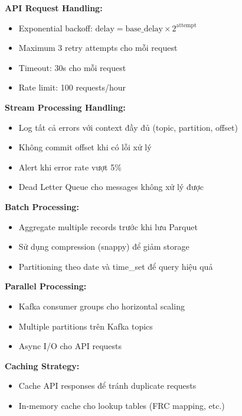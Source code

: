 
\textbf{API Request Handling:}
\begin{itemize}
    \item Exponential backoff: $\text{delay} = \text{base\_delay} \times 2^{\text{attempt}}$
    \item Maximum 3 retry attempts cho mỗi request
    \item Timeout: 30s cho mỗi request
    \item Rate limit: 100 requests/hour
\end{itemize}

\textbf{Stream Processing Handling:}
\begin{itemize}
    \item Log tất cả errors với context đầy đủ (topic, partition, offset)
    \item Không commit offset khi có lỗi xử lý
    \item Alert khi error rate vượt 5\%
    \item Dead Letter Queue cho messages không xử lý được
\end{itemize}


\textbf{Batch Processing:}
\begin{itemize}
    \item Aggregate multiple records trước khi lưu Parquet
    \item Sử dụng compression (snappy) để giảm storage
    \item Partitioning theo date và time\_set để query hiệu quả
\end{itemize}

\textbf{Parallel Processing:}
\begin{itemize}
    \item Kafka consumer groups cho horizontal scaling
    \item Multiple partitions trên Kafka topics
    \item Async I/O cho API requests
\end{itemize}

\textbf{Caching Strategy:}
\begin{itemize}
    \item Cache API responses để tránh duplicate requests
    \item In-memory cache cho lookup tables (FRC mapping, etc.)
\end{itemize}

